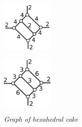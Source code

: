 \documentclass[suppldata, dvipdfmx]{interact}
\theoremstyle{plain}%
\theoremstyle{definition}
\theoremstyle{remark}
\theoremstyle{problemstyle}
\begin{document}
\begin{figure}[h!tbp]
\begin{minipage}[t]{0.6\textwidth}
\begin{minipage}[t]{0.19\textwidth}
   \centering
   \includegraphics[width=1in, keepaspectratio]{./img/HexahedraWithSphericalFaces/hexahedralCake/hexahedralCake_b.png}
   \subcaption{}
   \label{}
  \end{minipage}
 \hspace*{\fill}
  \begin{minipage}[t]{0.19\textwidth}
   \centering
   \includegraphics[width=1in, keepaspectratio]{./img/HexahedraWithSphericalFaces/hexahedralCake/hexahedralCake_c.png}
   \subcaption{}
   \label{fig:}
  \end{minipage}
 \hspace*{\fill}
  \caption{\textit{Graph of hexahedral cake}}
  \label{fig:}
 \end{minipage}
\end{figure}
\end{document}
